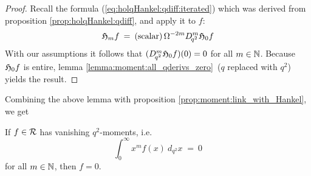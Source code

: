 \begin{proof}
Recall the formula (\ref{eq:holqHankel:qdiff:iterated}) which was
derived from proposition \ref{prop:holqHankel:qdiff}, and apply it to $f$:
$$  \mathfrak{H}_{m} f \:=\: ({\rm scalar})\, \Omega^{-2m} D_{\!q^2}^m \mathfrak{H}_{0} f $$
With our assumptions it follows that $(D_{\!q^2}^m \mathfrak{H}_{0} f)(0) = 0$ for all $m\in \mathbb{N}$.
Because $\mathfrak{H}_{0} f$ is entire,
lemma \ref{lemma:moment:all_qderivs_zero}\ ($q$ replaced with $q^2$)
yields the result.
\end{proof}
\vspace{2ex}


Combining the above lemma with proposition \ref{prop:moment:link_with_Hankel}, we get

\begin{thm_sec} \label{thm:qmoment}
If\/ $f\in\mathcal R$ has vanishing\/ $q^2$-moments, i.e.
$$ \int_0^\infty x^m f(x)\: d_{q^2}x \;=\: 0$$
for all\/ $m\in\mathbb{N}$, then\/ $f=0$.
\end{thm_sec}
